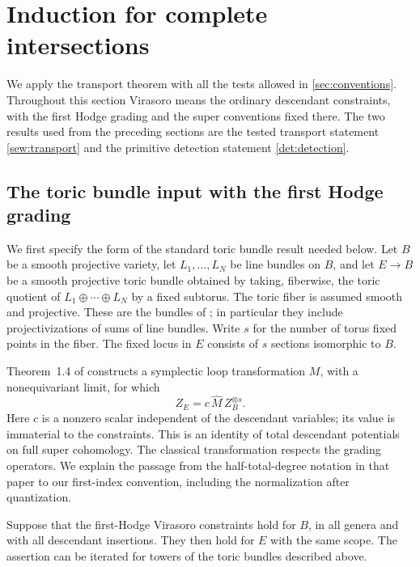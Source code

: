 \section{Induction for complete intersections}
\label{ind:section}

We apply the transport theorem with all the tests allowed in
\cref{sec:conventions}. Throughout this section Virasoro means the
ordinary descendant constraints, with the first Hodge grading and the
super conventions fixed there. The two results used from the preceding
sections are the tested transport statement \cref{sew:transport} and the
primitive detection statement \cref{det:detection}.

\subsection{The toric bundle input with the first Hodge grading}

We first specify the form of the standard toric bundle result needed
below. Let $B$ be a smooth projective variety, let $L_1,\ldots,L_N$ be line
bundles on $B$, and let $E\to B$ be a smooth projective toric bundle
obtained by taking, fiberwise, the toric quotient of
$L_1\oplus\cdots\oplus L_N$ by a fixed subtorus. The toric fiber is
assumed smooth and projective. These are the bundles of
\cite[\S1.6]{CGT}; in particular they include projectivizations of sums
of line bundles. Write $s$ for the number of torus fixed points in the
fiber. The fixed locus in $E$ consists of $s$ sections isomorphic to
$B$.

Theorem~1.4 of \cite{CGT} constructs a symplectic loop transformation
$M$, with a nonequivariant limit, for which
\begin{equation}
\label{ind:descendant-transform}
 Z_E=c\,\widehat M\, Z_B^{\otimes s}.
\end{equation}
Here $c$ is a nonzero scalar independent of the descendant variables;
its value is immaterial to the constraints. This is an identity of total
descendant potentials on full super cohomology. The classical
transformation respects the grading operators. We explain the passage
from the half-total-degree notation in that paper to our first-index
convention, including the normalization after quantization.

\begin{proposition}
\label{ind:toric}
Suppose that the first-Hodge Virasoro constraints hold for $B$, in all
genera and with all descendant insertions. They then hold for $E$ with
the same scope. The assertion can be iterated for towers of the toric
bundles described above.
\end{proposition}

